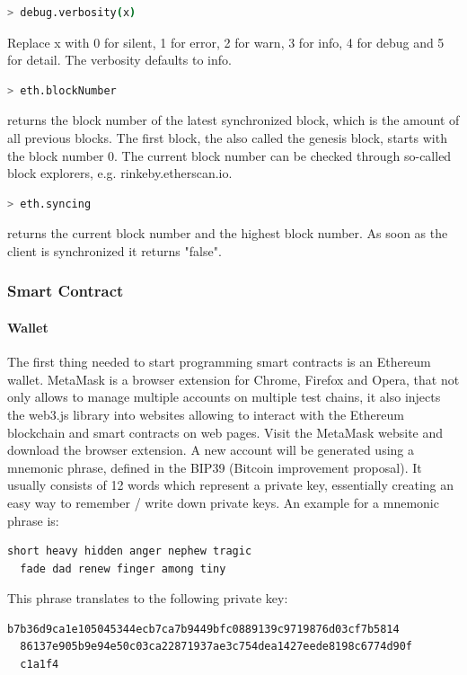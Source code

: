 \begin{lstlisting}[language=bash]
  > debug.verbosity(x)
\end{lstlisting}

Replace x with 0 for silent, 1 for error, 2 for warn, 3 for info, 4 for debug and 5 for detail. The verbosity defaults to info\cite{cli-options}.
\newpage

\begin{lstlisting}[language=bash]
  > eth.blockNumber
\end{lstlisting}

returns the block number of the latest synchronized block, which is the amount of all previous blocks. The first block, the also called the genesis block, starts with the block number 0. The current block number can be checked through so-called block explorers, e.g. {rinkeby.etherscan.io}.
\\
\begin{lstlisting}[language=bash]
  > eth.syncing
\end{lstlisting}
returns the current block number and the highest block number. As soon as the client is synchronized it returns "false"\cite{javascript-0.20}.


\subsubsection{Smart Contract}
\paragraph{Wallet}
The first thing needed to start programming smart contracts is an Ethereum wallet. MetaMask is a browser extension for Chrome, Firefox and Opera, that not only allows to manage multiple accounts on multiple test chains, it also injects the web3.js library into websites allowing to interact with the Ethereum blockchain and smart contracts on web pages.
Visit the MetaMask\cite{metamask} website and download the browser extension. A new account will be generated using a mnemonic phrase, defined in the BIP39 (Bitcoin improvement proposal)\cite{bip39}. It usually consists of 12 words which represent a private key, essentially creating an easy way to remember / write down private keys. An example for a mnemonic phrase is:
\begin{lstlisting}[language=bash]
  short heavy hidden anger nephew tragic
  fade dad renew finger among tiny
\end{lstlisting}
This phrase translates to the following private key:
\begin{lstlisting}[language=bash]
  b7b36d9ca1e105045344ecb7ca7b9449bfc0889139c9719876d03cf7b5814
  86137e905b9e94e50c03ca22871937ae3c754dea1427eede8198c6774d90f
  c1a1f4
\end{lstlisting}

